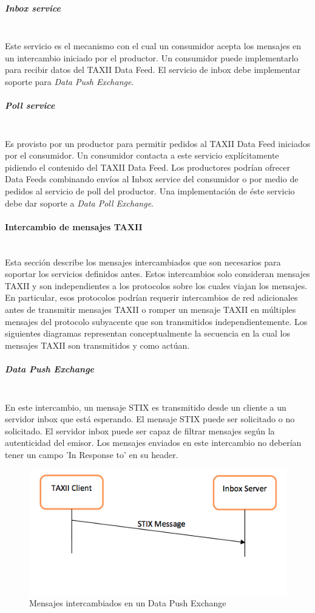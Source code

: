 \subparagraph{Inbox service}\ \\
Este servicio es el mecanismo con el cual un consumidor acepta los mensajes en 
un intercambio iniciado por el productor. Un consumidor puede implementarlo 
para recibir datos del TAXII Data Feed.
El servicio de inbox debe implementar soporte para \textit{Data Push Exchange}.

\subparagraph{Poll service}\ \\
Es provisto por un productor para permitir pedidos al TAXII Data Feed iniciados 
por  el consumidor. Un consumidor contacta a este servicio explícitamente 
pidiendo el contenido del TAXII Data Feed. Los productores podrían ofrecer Data 
Feeds combinando envíos al Inbox service del consumidor o por medio de pedidos 
al servicio de poll del productor.
Una implementación de éste servicio debe dar soporte a \textit{Data Poll Exchange}.

\paragraph{Intercambio de mensajes TAXII}\ \\

Esta sección describe los mensajes intercambiados que son necesarios para soportar 
los servicios definidos antes. Estos intercambios solo consideran mensajes 
TAXII y son independientes a los protocolos sobre los cuales viajan los mensajes.
 En particular, esos protocolos podrían requerir intercambios de red 
adicionales antes de transmitir mensajes TAXII o romper un mensaje TAXII en 
múltiples mensajes del protocolo subyacente que son transmitidos 
independientemente. Los siguientes diagramas representan conceptualmente la 
secuencia en la cual los mensajes TAXII son transmitidos y como actúan.

\subparagraph{Data Push Exchange}\ \\
En este intercambio, un mensaje STIX es transmitido desde un cliente a un 
servidor inbox que está esperando. El mensaje STIX puede ser solicitado o no 
solicitado. El servidor inbox puede ser capaz de filtrar mensajes según la 
autenticidad del emisor. Los mensajes enviados en este intercambio no deberían 
tener un campo 'In Response to' en su header.

\begin{figure}[ht!]
  \centering
    \includegraphics[width=150mm]{./images/DataPushExchange.png}
    \caption{Mensajes intercambiados en un Data Push Exchange \protect\cite{b1}}
\end{figure}

